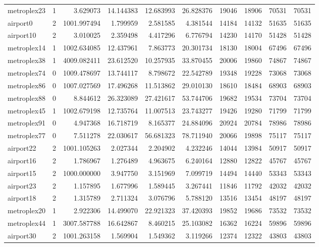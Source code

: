 \begin{longtable}{|l|r|r|r|r|r|r|r|r|r|}
metroplex23 & 1 & 3.629073 & 14.144383 & 12.683993 & 26.828376 & 19046 & 18906 & 70531 & 70531 \\
airport0 & 2 & 1001.997494 & 1.799959 & 2.581585 & 4.381544 & 14184 & 14132 & 51635 & 51635 \\
airport10 & 2 & 3.010025 & 2.359498 & 4.417296 & 6.776794 & 14230 & 14170 & 51428 & 51428 \\
metroplex14 & 1 & 1002.634085 & 12.437961 & 7.863773 & 20.301734 & 18130 & 18004 & 67496 & 67496 \\
metroplex38 & 1 & 4009.082411 & 23.612520 & 10.257935 & 33.870455 & 20006 & 19860 & 74867 & 74867 \\
metroplex74 & 0 & 1009.478697 & 13.744117 & 8.798672 & 22.542789 & 19348 & 19228 & 73068 & 73068 \\
metroplex86 & 0 & 1007.027569 & 17.496268 & 11.513862 & 29.010130 & 18610 & 18484 & 68903 & 68903 \\
metroplex88 & 0 & 8.844612 & 26.323089 & 27.421617 & 53.744706 & 19682 & 19534 & 73704 & 73704 \\
metroplex45 & 1 & 1002.679198 & 12.735764 & 11.007513 & 23.743277 & 19426 & 19280 & 71799 & 71799 \\
metroplex91 & 0 & 4.947368 & 16.718719 & 8.165377 & 24.884096 & 20924 & 20784 & 78986 & 78986 \\
metroplex77 & 0 & 7.511278 & 22.030617 & 56.681323 & 78.711940 & 20066 & 19898 & 75117 & 75117 \\
airport22 & 2 & 1001.105263 & 2.027344 & 2.204902 & 4.232246 & 14044 & 13984 & 50917 & 50917 \\
airport16 & 2 & 1.786967 & 1.276489 & 4.963675 & 6.240164 & 12880 & 12822 & 45767 & 45767 \\
airport15 & 2 & 1000.000000 & 3.947750 & 3.151969 & 7.099719 & 14494 & 14440 & 53343 & 53343 \\
airport23 & 2 & 1.157895 & 1.677996 & 1.589445 & 3.267441 & 11846 & 11792 & 42032 & 42032 \\
airport18 & 2 & 1.315789 & 2.711324 & 3.076796 & 5.788120 & 13516 & 13454 & 48197 & 48197 \\
metroplex20 & 1 & 2.922306 & 14.499070 & 22.921323 & 37.420393 & 19852 & 19686 & 73532 & 73532 \\
metroplex44 & 1 & 3007.587788 & 16.642867 & 8.460215 & 25.103082 & 16362 & 16224 & 59896 & 59896 \\
airport30 & 2 & 1001.263158 & 1.569904 & 1.549362 & 3.119266 & 12374 & 12322 & 43803 & 43803 \\

\end{longtable}
